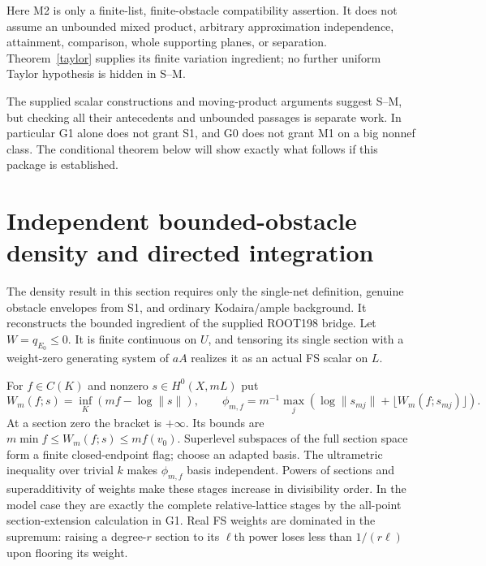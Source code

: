 \documentclass[10pt]{article}
\begin{document}
Here M2 is only a finite-list, finite-obstacle compatibility assertion.
It does not assume an unbounded mixed product, arbitrary approximation
independence, attainment, comparison, whole supporting planes, or separation.
Theorem~\ref{taylor} supplies its finite variation ingredient; no further
uniform Taylor hypothesis is hidden in S--M.

The supplied scalar constructions and moving-product arguments suggest
S--M, but checking all their antecedents and unbounded passages is separate
work. In particular G1 alone does not grant S1, and G0 does not grant M1
on a big nonnef class. The conditional theorem below will show exactly
what follows if this package is established.

\section{Independent bounded-obstacle density and directed integration}
The density result in this section requires only the single-net definition,
genuine obstacle envelopes from S1, and ordinary Kodaira/ample background.
It reconstructs the bounded ingredient of the supplied ROOT198 bridge.
Let $W=q_{E_0}\leq0$. It is finite continuous on $U$, and tensoring its
single section with a weight-zero generating system of $aA$ realizes it
as an actual FS scalar on $L$.

For $f\in C(K)$ and nonzero $s\in H^0(X,mL)$ put
\[
 W_m(f;s)=\inf_K(mf-\log\|s\|),
 \qquad
 \phi_{m,f}=m^{-1}\max_j(\log\|s_{mj}\|+\lfloor W_m(f;s_{mj})\rfloor).
\]
At a section zero the bracket is $+\infty$. Its bounds are
$m\min f\leq W_m(f;s)\leq m f(v_0)$. Superlevel subspaces of the
full section space form a finite closed-endpoint flag; choose an adapted
basis. The ultrametric inequality over trivial $k$ makes $\phi_{m,f}$
basis independent. Powers of sections and superadditivity of weights
make these stages increase in divisibility order. In the model case
they are exactly the complete relative-lattice stages by the all-point
section-extension calculation in G1. Real FS weights are dominated in
the supremum: raising a degree-$r$ section to its $\ell$th power loses
less than $1/(r\ell)$ upon flooring its weight.
\end{document}
